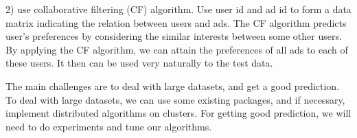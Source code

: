 \documentclass[paper=letter, fontsize=12pt]{article}
\begin{document}
2) use collaborative filtering (CF) algorithm. Use user id and ad id to form a data matrix indicating the relation between users and ads. The CF algorithm predicts user's preferences by considering the similar interests between some other users. By applying the CF algorithm, we can attain the preferences of all ads to each of these users. It then can be used very naturally to the test data.

The main challenges are to deal with large datasets, and get a good prediction. To deal with large datasets, we can use some existing packages, and if necessary, implement distributed algorithms on clusters. For getting good prediction, we will need to do experiments and tune our algorithms.
 
\end{document}
